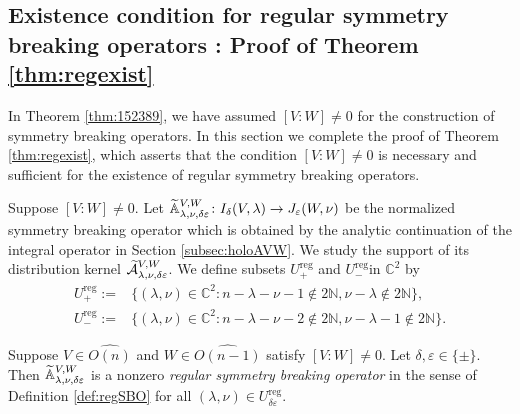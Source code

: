 \subsection{Existence condition for regular symmetry breaking operators :
Proof of Theorem \ref{thm:regexist}}
\label{subsec:regexist}
In Theorem \ref{thm:152389}, 
 we have assumed 
 $[V:W] \ne 0$ for the construction 
 of symmetry breaking operators.  
In this section 
 we complete the proof of Theorem \ref{thm:regexist}, 
 which asserts
 that the condition $[V:W] \ne 0$ is necessary
 and sufficient for the existence
 of regular symmetry breaking operators.  



Suppose $[V:W]\ne 0$.  
Let ${\widetilde{\mathbb{A}}}_{{\lambda},{\nu},{\delta\varepsilon}}^{{V,W}} \colon 
 I_{\delta}(V,\lambda) \to J_{\varepsilon}(W,\nu)$
 be the normalized symmetry breaking operator
 which is obtained by the analytic continuation
 of the integral operator
 in Section \ref{subsec:holoAVW}.  
We study the support
 of its distribution kernel 
 $\widetilde{{\mathcal{A}}}_{{\lambda},{\nu},{\delta\varepsilon}}^{{V,W}}$.  
We define subsets $U_{+}^{{\operatorname{reg}}}$ and $U_{-}^{{\operatorname{reg}}}$in ${\mathbb{C}}^2$ by
\begin{align}
\label{eqn:Ureg+}
U_{+}^{{\operatorname{reg}}}:=&
\{(\lambda,\nu) \in {\mathbb{C}}^2
:
 n-\lambda-\nu-1 \not\in 2 {\mathbb{N}}, \nu-\lambda \not\in 2 {\mathbb{N}}\}, 
\\
\label{eqn:Ureg-}
U_{-}^{{\operatorname{reg}}}:=&
\{(\lambda,\nu) \in {\mathbb{C}}^2
:
 n-\lambda-\nu-2 \not\in 2 {\mathbb{N}}, \nu-\lambda-1 \not\in 2 {\mathbb{N}}\}.  
\end{align}
\begin{proposition}
\label{prop:172425}
Suppose $V \in \widehat{O(n)}$ and $W \in \widehat{O(n-1)}$
 satisfy $[V:W]\ne 0$.  
Let $\delta, \varepsilon \in \{\pm\}$.  
Then ${\widetilde{\mathbb{A}}}_{{\lambda},{\nu},{\delta\varepsilon}}^{{V,W}}$
 is a nonzero 
{\it{regular symmetry breaking operator}}
 in the sense of Definition \ref{def:regSBO}
 for all $(\lambda,\nu) \in U_{\delta \varepsilon}^{{\operatorname{reg}}}$.  
\end{proposition}
